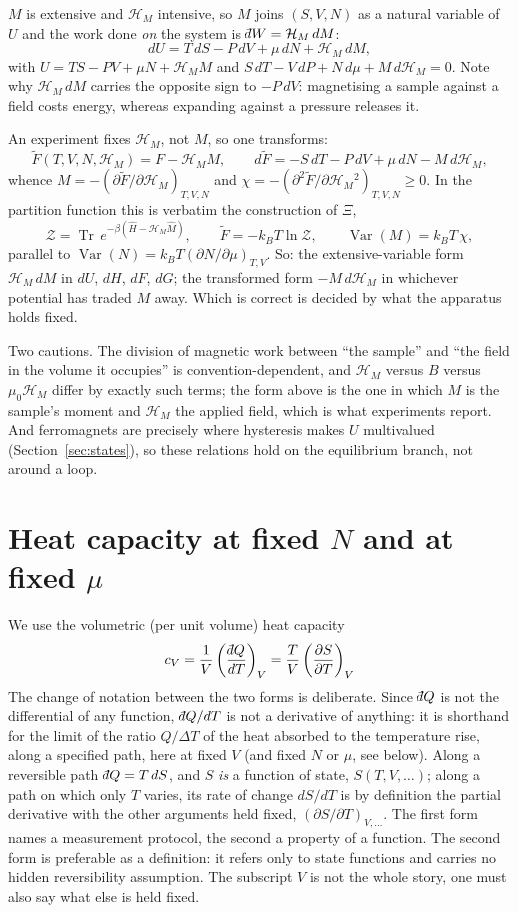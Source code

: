 \documentclass[10pt,a4paper]{article}
\theoremstyle{remark}
\newcommand{\dbar}{\mathchar'26\mkern-11mu d}
\newcommand{\Var}{\operatorname{Var}}
\newcommand{\Tr}{\operatorname{Tr}}
\newcommand{\hmag}{\mathcal{H}_M}
\begin{document}
$M$ is extensive and $\hmag{}$ intensive, so $M$ joins $(S,V,N)$ as a natural
variable of $U$ and the work done \emph{on} the system is
$\dbar W=\hmag{}\,dM$:
\[
dU=T\,dS-P\,dV+\mu\,dN+\hmag{}\,dM ,
\]
with $U=TS-PV+\mu N+\hmag{}M$ and $S\,dT-V\,dP+N\,d\mu+M\,d\hmag{}=0$.
Note why $\hmag{}\,dM$ carries the opposite sign to $-P\,dV$: magnetising a
sample against a field costs energy, whereas expanding against a pressure
releases it.

An experiment fixes $\hmag{}$, not $M$, so one transforms:
\[
\tilde F(T,V,N,\hmag{})=F-\hmag{}M,
\qquad
d\tilde F=-S\,dT-P\,dV+\mu\,dN-M\,d\hmag{} ,
\]
whence $M=-(\partial\tilde F/\partial\hmag{})_{T,V,N}$ and
$\chi=-(\partial^{2}\tilde F/\partial\hmag{}^{2})_{T,V,N}\geq0$. In the
partition function this is verbatim the construction of $\Xi$,
\[
\mathcal{Z}=\Tr\,e^{-\beta(\hat H-\hmag{}\hat M)},
\qquad
\tilde F=-k_BT\ln\mathcal{Z},
\qquad
\Var(M)=k_BT\,\chi ,
\]
parallel to $\Var(N)=k_BT(\partial N/\partial\mu)_{T,V}$. So: the
extensive-variable form $\hmag{}\,dM$ in $dU$, $dH$, $dF$, $dG$; the
transformed form $-M\,d\hmag{}$ in whichever potential has traded $M$ away.
Which is correct is decided by what the apparatus holds fixed.

Two cautions. The division of magnetic work between ``the sample'' and ``the
field in the volume it occupies'' is convention-dependent, and $\hmag{}$
versus $B$ versus $\mu_0\hmag{}$ differ by exactly such terms; the form above
is the one in which $M$ is the sample's moment and $\hmag{}$ the applied
field, which is what experiments report. And ferromagnets are precisely where
hysteresis makes $U$ multivalued (Section~\ref{sec:states}), so these relations hold
on the equilibrium branch, not around a loop.



\section{Heat capacity at fixed \texorpdfstring{$N$}{N} and at fixed \texorpdfstring{$\mu$}{mu}}
\label{app:cmu}

We use the volumetric (per unit volume) heat capacity
\[
\;c_V=\frac{1}{V}\left(\frac{\dbar Q}{dT}\right)_V
=\frac{T}{V}\left(\frac{\partial S}{\partial T}\right)_V\
\]
The change of notation between the two forms is deliberate. Since $ \dbar Q $ is
not the differential of any function, $ \dbar Q/dT $ is not a derivative of
anything: it is shorthand for the limit of the ratio $ Q/\Delta T $ of the heat
absorbed to the temperature rise, along a specified path, here at fixed $ V $ (and
fixed $ N $ or $ \mu $, see below). Along a reversible path $ \dbar Q = T\,dS $, and
$ S $ \emph{is} a function of state, $ S(T, V, \dots) $; along a path on which only
$ T $ varies, its rate of change $ dS/dT $ is by definition the partial derivative
with the other arguments held fixed, $ (\partial S/\partial T)_{V,\dots} $. The
first form names a measurement protocol, the second a property of a function.
The second form is preferable as a definition: it refers only to state functions
and carries no hidden reversibility assumption. The subscript $V$ is not the whole
story, one must also say what else is held fixed.
\end{document}
